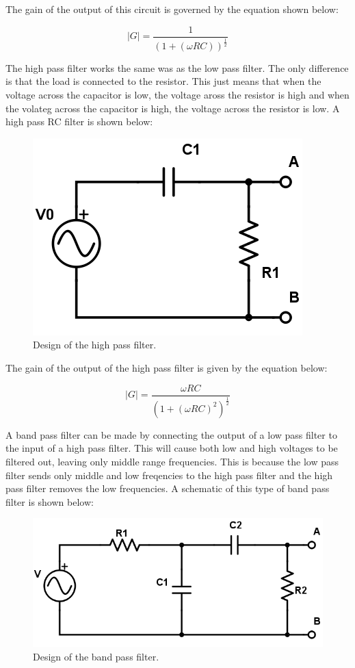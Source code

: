 \documentclass[twocolumn, amsmath]{revtex4}
\begin{document}
The gain of the output of this circuit is governed by the equation shown below:

\begin{equation}
|G| = \frac{1}{(1 + (\omega RC))^{\frac{1}{2}}}
\end{equation}

The high pass filter works the same was as the low pass filter. The only difference is that the load is connected to the resistor. This just means that when the voltage across the capacitor is low, the voltage aross the resistor is high and when the volateg across the capacitor is high, the voltage across the resistor is low. A high pass RC filter is shown below:

\begin{figure}[h]  
	\includegraphics[scale = 0.2]{highpassfilter.png}
	\caption{Design of the high pass filter.}
\end{figure}

The gain of the output of the high pass filter is given by the equation below:

\begin{equation}
|G| = \frac{\omega RC}{(1 + (\omega RC)^2)^{\frac{1}{2}}}
\end{equation}

A band pass filter can be made by connecting the output of a low pass filter to the input of a high pass filter. This will cause both low and high voltages to be filtered out, leaving only middle range frequencies. This is because the low pass filter sends only  middle and low freqencies to the high pass filter and the high pass filter removes the low frequencies. A schematic of this type of band pass filter is shown below:

\begin{figure}[h]  
	\includegraphics[scale = 0.2]{bandpassfilter.png}
	\caption{Design of the band pass filter.}
\end{figure}
\end{document}
